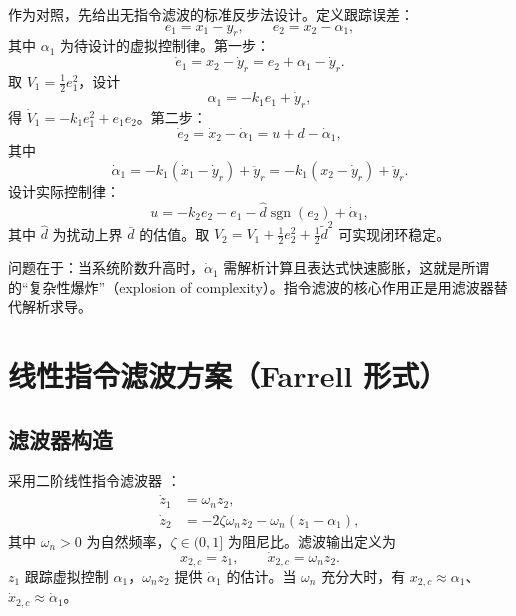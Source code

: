 \documentclass[UTF8,a4paper,11pt]{ctexart}
\begin{document}
作为对照，先给出无指令滤波的标准反步法设计。定义跟踪误差：
\begin{equation}
e_1 = x_1 - y_r, \qquad e_2 = x_2 - \alpha_1,
\end{equation}
其中 $\alpha_1$ 为待设计的虚拟控制律。第一步：
\begin{equation}
\dot{e}_1 = x_2 - \dot{y}_r = e_2 + \alpha_1 - \dot{y}_r.
\end{equation}
取 $V_1 = \frac12 e_1^2$，设计
\begin{equation}
\alpha_1 = -k_1 e_1 + \dot{y}_r,
\end{equation}
得 $\dot{V}_1 = -k_1 e_1^2 + e_1 e_2$。第二步：
\begin{equation}
\dot{e}_2 = \dot{x}_2 - \dot{\alpha}_1 = u + d - \dot{\alpha}_1,
\end{equation}
其中
\begin{equation}
\dot{\alpha}_1 = -k_1(\dot{x}_1 - \dot{y}_r) + \ddot{y}_r = -k_1(x_2 - \dot{y}_r) + \ddot{y}_r.
\end{equation}
设计实际控制律：
\begin{equation}
u = -k_2 e_2 - e_1 - \hat{d}\operatorname{sgn}(e_2) + \dot{\alpha}_1,
\end{equation}
其中 $\hat{d}$ 为扰动上界 $\bar{d}$ 的估值。取 $V_2 = V_1 + \frac12 e_2^2 + \frac12 \tilde{d}^2$ 可实现闭环稳定。

问题在于：当系统阶数升高时，$\dot{\alpha}_1$ 需解析计算且表达式快速膨胀，这就是所谓的``复杂性爆炸''（explosion of complexity）。指令滤波的核心作用正是用滤波器替代解析求导。

\section{线性指令滤波方案（Farrell 形式）}

\subsection{滤波器构造}

采用二阶线性指令滤波器 \cite{Farrell2009CFB}：
\begin{equation}
\label{eq:linear_filter}
\begin{aligned}
\dot{z}_1 &= \omega_n z_2, \\
\dot{z}_2 &= -2\zeta\omega_n z_2 - \omega_n(z_1 - \alpha_1),
\end{aligned}
\end{equation}
其中 $\omega_n > 0$ 为自然频率，$\zeta \in (0,1]$ 为阻尼比。滤波输出定义为
\begin{equation}
x_{2,c} = z_1, \qquad \dot{x}_{2,c} = \omega_n z_2.
\end{equation}
$z_1$ 跟踪虚拟控制 $\alpha_1$，$\omega_n z_2$ 提供 $\dot{\alpha}_1$ 的估计。当 $\omega_n$ 充分大时，有 $x_{2,c} \approx \alpha_1$、$\dot{x}_{2,c} \approx \dot{\alpha}_1$。
\end{document}
